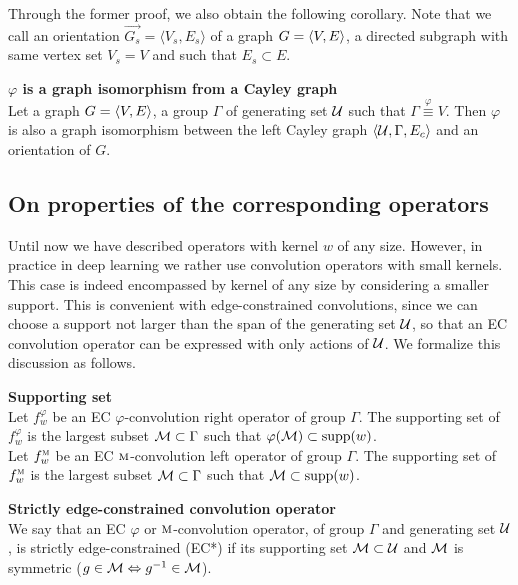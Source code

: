 Through the former proof, we also obtain the following corollary. Note that we call an orientation $\vec{G_s} = \langle V_s, E_s \rangle$ of a graph $G = \langle V, E \rangle$, a directed subgraph with same vertex set $V_s = V$ and such that $E_s \subset E$.

\begin{corollary}\textbf{$\varphi$ is a graph isomorphism from a Cayley graph}\\
Let a graph $G = \langle V, E \rangle$, a group $\Gamma$ of generating set $\mathcal{U}$ such that $\Gamma \overset\varphi\equiv V$. Then $\varphi$ is also a graph isomorphism between the left Cayley graph $\langle \mathcal{U}, \Gamma, E_c \rangle$ and an orientation of $G$.
\label{cor:giso}
\end{corollary}

\subsection{On properties of the corresponding operators}
\label{sec:ec}

Until now we have described operators with kernel $w$ of any size. However, in practice in deep learning we rather use convolution operators with small kernels. This case is indeed encompassed by kernel of any size by considering a smaller support. This is convenient with edge-constrained convolutions, since we can choose a support not larger than the span of the generating set $\mathcal{U}$, so that an EC convolution operator can be expressed with only actions of $\mathcal{U}$.
We formalize this discussion as follows.

\begin{definition}\textbf{Supporting set}\\
Let $f_w^\varphi$ be an EC $\varphi$-convolution right operator of group $\Gamma$. The supporting set of $f_w^\varphi$ is the largest subset $\mathcal{M} \subset \Gamma$ such that $\varphi(\mathcal{M}) \subset \operatorname{supp}(w)$.\\
Let $f_w^{\operatorname{\textsc{m}}}$ be an EC $\operatorname{\textsc{m}}$-convolution left operator of group $\Gamma$. The supporting set of $f_w^{\operatorname{\textsc{m}}}$ is the largest subset $\mathcal{M} \subset \Gamma$ such that $\mathcal{M} \subset \operatorname{supp}(w)$.
\end{definition}

\begin{definition}\textbf{Strictly edge-constrained convolution operator}\\
We say that an EC $\varphi$ or $\operatorname{\textsc{m}}$-convolution operator, of group $\Gamma$ and generating set $\mathcal{U}$, is strictly edge-constrained (EC*) if its supporting set $\mathcal{M} \subset \mathcal{U}$ and $\mathcal{M}$ is symmetric (\ie $g \in \mathcal{M} \Leftrightarrow g^{-1} \in \mathcal{M}$).
\end{definition}

